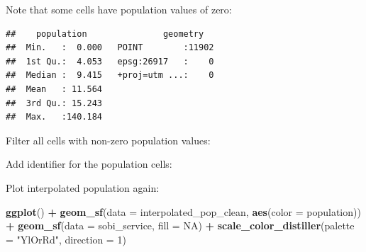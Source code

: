 \documentclass[
]{article}
\newenvironment{Shaded}{\begin{snugshade}}{\end{snugshade}}
\newcommand{\DataTypeTok}[1]{\textcolor[rgb]{0.13,0.29,0.53}{#1}}
\newcommand{\DecValTok}[1]{\textcolor[rgb]{0.00,0.00,0.81}{#1}}
\newcommand{\KeywordTok}[1]{\textcolor[rgb]{0.13,0.29,0.53}{\textbf{#1}}}
\newcommand{\NormalTok}[1]{#1}
\newcommand{\OperatorTok}[1]{\textcolor[rgb]{0.81,0.36,0.00}{\textbf{#1}}}
\newcommand{\OtherTok}[1]{\textcolor[rgb]{0.56,0.35,0.01}{#1}}
\newcommand{\StringTok}[1]{\textcolor[rgb]{0.31,0.60,0.02}{#1}}
\begin{document}
Note that some cells have population values of zero:

\begin{Shaded}
\end{Shaded}

\begin{verbatim}
##    population               geometry    
##  Min.   :  0.000   POINT        :11902  
##  1st Qu.:  4.053   epsg:26917   :    0  
##  Median :  9.415   +proj=utm ...:    0  
##  Mean   : 11.564                        
##  3rd Qu.: 15.243                        
##  Max.   :140.184
\end{verbatim}

Filter all cells with non-zero population values:

\begin{Shaded}
\end{Shaded}

Add identifier for the population cells:

\begin{Shaded}
\end{Shaded}

Plot interpolated population again:

\begin{Shaded}
\begin{Highlighting}[]
\KeywordTok{ggplot}\NormalTok{() }\OperatorTok{+}\StringTok{ }
\StringTok{  }\KeywordTok{geom_sf}\NormalTok{(}\DataTypeTok{data =}\NormalTok{ interpolated_pop_clean,}
          \KeywordTok{aes}\NormalTok{(}\DataTypeTok{color =}\NormalTok{ population)) }\OperatorTok{+}
\StringTok{  }\KeywordTok{geom_sf}\NormalTok{(}\DataTypeTok{data =}\NormalTok{ sobi_service,}
          \DataTypeTok{fill =} \OtherTok{NA}\NormalTok{) }\OperatorTok{+}
\StringTok{  }\KeywordTok{scale_color_distiller}\NormalTok{(}\DataTypeTok{palette =} \StringTok{"YlOrRd"}\NormalTok{, }
                        \DataTypeTok{direction =} \DecValTok{1}\NormalTok{)}
\end{Highlighting}
\end{Shaded}
\end{document}
